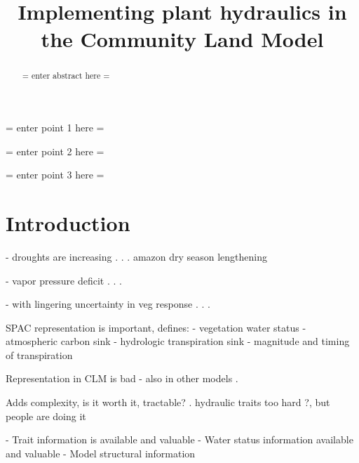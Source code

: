 \documentclass[draft,linenumbers]{agujournal}
\begin{document}
\title{Implementing plant hydraulics in the Community Land Model}



\begin{keypoints}
\item = enter point 1 here = 
\item = enter point 2 here = 
\item = enter point 3 here = 
\end{keypoints}


\begin{abstract}
= enter abstract here =
\end{abstract}


\section{Introduction}



 - droughts are increasing 
      . \citep{cook2015}
      . \citep{dai2013}
      . amazon dry season lengthening \citep{fu2013}

 - vapor pressure deficit 
      . \citep{mcdowell2015}
      . \citep{novick2016b}
      . \citep{williams2013}

 - with lingering uncertainty in veg response
      . \citep{dekauwe2017}
      . \citep{friedlingstein2014}
      . \citep{anderegg2015b}


SPAC representation is important, defines:
  - vegetation water status
  - atmospheric carbon sink
  - hydrologic transpiration sink
  - magnitude and timing of transpiration

Representation in CLM is bad
  - also in other models
      . \citep{powell2013,ukkola2016}


Adds complexity, is it worth it, tractable?
       . hydraulic traits too hard \citep{drake2017}?, but people are doing it \citep{xu2016,christoffersen2016}

  - Trait information is available \citep{kattge2011,anderegg2015a} and valuable \citep{choat2012}
  - Water status information available \citep{konings2016,grant2016} and valuable \citep{momen2017,konings2017b}
  - Model structural information
  
\end{document}
